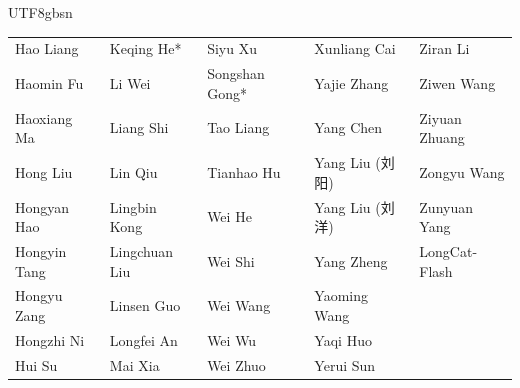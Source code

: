 \begin{CJK}{UTF8}{gbsn}
\begin{center}
\begin{tabular}{p{}p{}p{}p{}p{}}
Hao Liang & Keqing He* & Siyu Xu & Xunliang Cai & Ziran Li \\
Haomin Fu & Li Wei & Songshan Gong* & Yajie Zhang & Ziwen Wang \\
Haoxiang Ma & Liang Shi & Tao Liang & Yang Chen & Ziyuan Zhuang \\
Hong Liu & Lin Qiu & Tianhao Hu & Yang Liu (刘阳) & Zongyu Wang \\
Hongyan Hao & Lingbin Kong & Wei He & Yang Liu (刘洋) & Zunyuan Yang \\
Hongyin Tang & Lingchuan Liu & Wei Shi & Yang Zheng & LongCat-Flash \\
Hongyu Zang & Linsen Guo & Wei Wang & Yaoming Wang &  \\
Hongzhi Ni & Longfei An & Wei Wu & Yaqi Huo &  \\
Hui Su & Mai Xia & Wei Zhuo & Yerui Sun &  \\
\end{tabular}
\end{center}


\end{CJK}